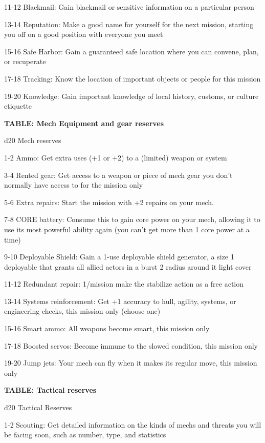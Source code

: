 11-12   Blackmail: Gain blackmail or sensitive information on a particular person

13-14   Reputation: Make a good name for yourself for the next mission, starting you off on a good position with everyone you meet

15-16   Safe Harbor: Gain a guaranteed safe location where you can convene, plan, or recuperate

17-18   Tracking: Know the location of important objects or people for this mission

19-20   Knowledge: Gain important knowledge of local history, customs, or culture etiquette

\textbf{TABLE: Mech Equipment and gear reserves}

d20       Mech	reserves

1-2     Ammo: Get extra uses (+1 or +2) to a (limited) weapon or system

3-4     Rented gear: Get access to a weapon or piece of mech gear you don't normally have access to for the mission only

5-6     Extra repairs: Start the mission with +2 repairs on your mech.

7-8     CORE battery: Consume this to gain core power on your mech, allowing it to use its most powerful ability again (you can't get more than 1 core power at a time)

9-10    Deployable Shield: Gain a 1-use deployable shield generator, a size 1 deployable that grants all allied actors in a burst 2 radius around it light cover

11-12   Redundant repair: 1/mission make the stabilize action as a free action

13-14   Systems reinforcement: Get +1 accuracy to hull, agility, systems, or engineering checks, this mission only (choose one)

15-16   Smart ammo: All weapons become smart, this mission only

17-18   Boosted servos: Become immune to the slowed condition, this mission only

19-20   Jump jets: Your mech can fly when it makes its regular move, this mission only

\textbf{TABLE: Tactical reserves}

d20       Tactical	Reserves

1-2     Scouting: Get detailed information on the kinds of mechs and threats you will be facing soon, such as number, type, and statistics

